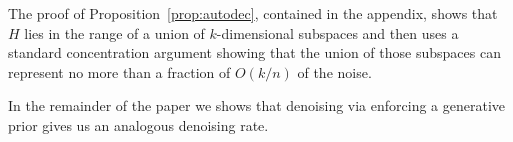 The proof of Proposition~\ref{prop:autodec}, contained in the appendix, shows that $H$ lies in the range of a union of $k$-dimensional subspaces and then uses a standard concentration argument showing that the union of those subspaces can represent no more than a fraction of $O(k/n)$ of the noise.

In the remainder of the paper we shows that denoising via enforcing a generative prior gives us an analogous denoising rate.


